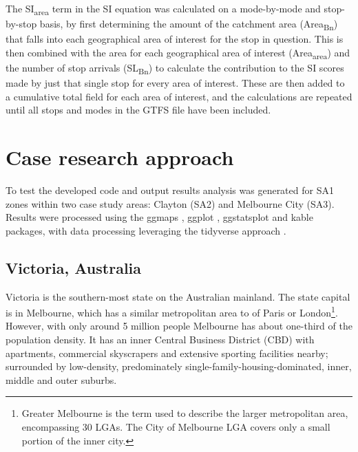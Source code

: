 \documentclass[]{tufte-book}
\begin{document}
The SI\textsubscript{area} term in the SI equation was calculated on a
mode-by-mode and stop-by-stop basis, by first determining the amount of
the catchment area (Area\textsubscript{Bn}) that falls into each
geographical area of interest for the stop in question. This is then
combined with the area for each geographical area of interest
(Area\textsubscript{area}) and the number of stop arrivals
(SL\textsubscript{Bn}) to calculate the contribution to the SI scores
made by just that single stop for every area of interest. These are then
added to a cumulative total field for each area of interest, and the
calculations are repeated until all stops and modes in the GTFS file
have been included.

\hypertarget{case-research-approach}{%
\section{Case research approach}\label{case-research-approach}}

To test the developed code and output results analysis was generated for
SA1 zones within two case study areas: Clayton (SA2) and Melbourne City
(SA3). Results were processed using the ggmaps \citep{R-ggmap}, ggplot
\citep{R-ggplot2}, ggstatsplot \citep{R-ggstatsplot} and kable
\citep{R-kableExtra, R-knitr} packages, with data processing leveraging
the tidyverse approach \citep{R-tidyverse}.

\hypertarget{victoria-australia}{%
\subsection{Victoria, Australia}\label{victoria-australia}}

Victoria is the southern-most state on the Australian mainland. The
state capital is in Melbourne, which has a similar metropolitan area to
of Paris or London\footnote{Greater Melbourne is the term used to
  describe the larger metropolitan area, encompassing 30 LGAs. The City
  of Melbourne LGA covers only a small portion of the inner city.}.
However, with only around 5 million people Melbourne has about one-third
of the population density. It has an inner Central Business District
(CBD) with apartments, commercial skyscrapers and extensive sporting
facilities nearby; surrounded by low-density, predominately
single-family-housing-dominated, inner, middle and outer suburbs.
\end{document}
